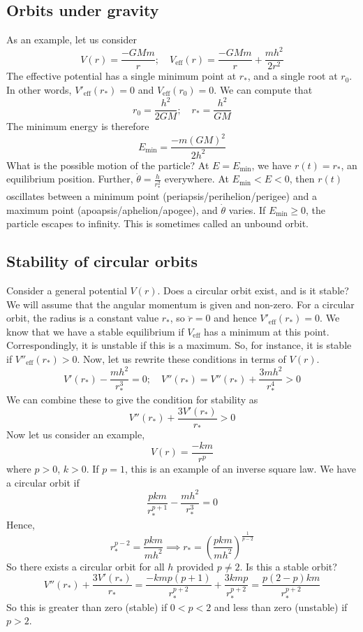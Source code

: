 \subsection{Orbits under gravity}
As an example, let us consider
\[
	V(r) = \frac{-GMm}{r};\quad V_\text{eff}(r) = \frac{-GMm}{r} + \frac{mh^2}{2r^2}
\]
The effective potential has a single minimum point at \(r_\ast\), and a single root at \(r_0\).
In other words, \(V'_\text{eff}(r_\ast) = 0\) and \(V_\text{eff}(r_0) = 0\).
We can compute that
\[
	r_0 = \frac{h^2}{2GM};\quad r_\ast = \frac{h^2}{GM}
\]
The minimum energy is therefore
\[
	E_\text{min} = \frac{-m(GM)^2}{2h^2}
\]
What is the possible motion of the particle?
At \(E = E_\text{min}\), we have \(r(t) = r_\ast\), an equilibrium position.
Further, \(\dot\theta = \frac{h}{r_\ast^2}\) everywhere.
At \(E_\text{min} < E < 0\), then \(r(t)\) oscillates between a minimum point (periapsis/perihelion/perigee) and a maximum point (apoapsis/aphelion/apogee), and \(\dot\theta\) varies.
If \(E_\text{min} \geq 0\), the particle escapes to infinity.
This is sometimes called an unbound orbit.

\subsection{Stability of circular orbits}
Consider a general potential \(V(r)\).
Does a circular orbit exist, and is it stable?
We will assume that the angular momentum is given and non-zero.
For a circular orbit, the radius is a constant value \(r_\ast\), so \(\ddot r = 0\) and hence \(V'_\text{eff}(r_\ast) = 0\).
We know that we have a stable equilibrium if \(V_\text{eff}\) has a minimum at this point.
Correspondingly, it is unstable if this is a maximum.
So, for instance, it is stable if \(V''_\text{eff}(r_\ast) > 0\).
Now, let us rewrite these conditions in terms of \(V(r)\).
\[
	V'(r_\ast) - \frac{mh^2}{r_\ast^3} = 0;\quad V''(r_\ast) = V''(r_\ast) + \frac{3mh^2}{r_\ast^4} > 0
\]
We can combine these to give the condition for stability as
\[
	V''(r_\ast) + \frac{3V'(r_\ast)}{r_\ast} > 0
\]
Now let us consider an example,
\[
	V(r) = \frac{-km}{r^p}
\]
where \(p>0\), \(k>0\).
If \(p=1\), this is an example of an inverse square law.
We have a circular orbit if
\[
	\frac{pkm}{r_\ast^{p+1}} - \frac{mh^2}{r_\ast^3} = 0
\]
Hence,
\[
	r_\ast^{p-2} = \frac{pkm}{mh^2} \implies r_\ast = \left( \frac{pkm}{mh^2} \right)^{\frac{1}{p-2}}
\]
So there exists a circular orbit for all \(h\) provided \(p \neq 2\).
Is this a stable orbit?
\[
	V''(r_\ast) + \frac{3V'(r_\ast)}{r_\ast} = \frac{-kmp(p+1)}{r_\ast^{p+2}} + \frac{3kmp}{r_\ast^{p+2}} = \frac{p(2-p)km}{r_\ast^{p+2}}
\]
So this is greater than zero (stable) if \(0 < p < 2\) and less than zero (unstable) if \(p > 2\).

